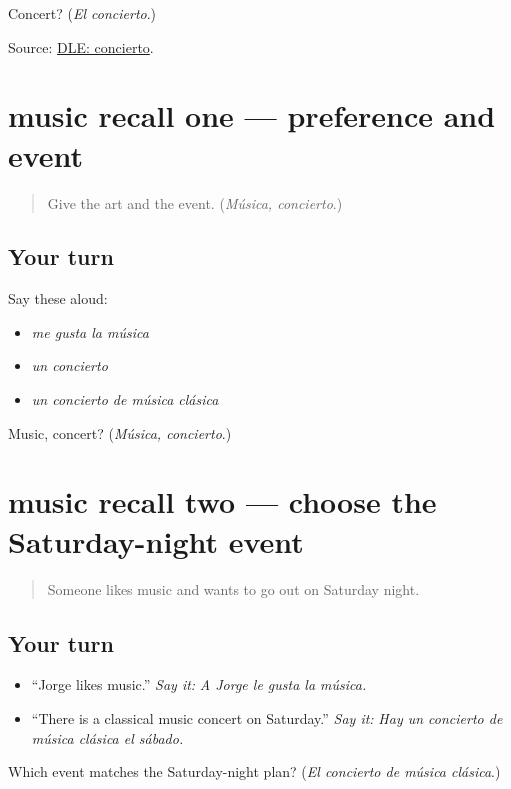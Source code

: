 \begin{tcolorbox}[breakable,colback=teal!4,colframe=teal!35!black,title={Before you move on}]
Concert? (\emph{El concierto}.)

Source: \href{https://dle.rae.es/concierto}{DLE: concierto}.
\end{tcolorbox}
\section[(review)]{music recall one — preference and event}

\label{lesson:ES-C413-music-recall-1}



\begin{quote}
Give the art and the event. (\emph{Música, concierto}.)
\end{quote}

\subsection*{Your turn}
Say these aloud:

\begin{itemize}
\raggedright
  \item \emph{me gusta la música}
  \item \emph{un concierto}
  \item \emph{un concierto de música clásica}
\end{itemize}

\begin{tcolorbox}[breakable,colback=teal!4,colframe=teal!35!black,title={Before you move on}]
Music, concert? (\emph{Música, concierto}.)
\end{tcolorbox}
\section[(review)]{music recall two — choose the Saturday-night event}

\label{lesson:ES-C413-music-recall-2}



\begin{quote}
Someone likes music and wants to go out on Saturday night.
\end{quote}

\subsection*{Your turn}
\begin{itemize}
\raggedright
  \item “Jorge likes music.” \emph{Say it:} \emph{A Jorge le gusta la música.}
  \item “There is a classical music concert on Saturday.” \emph{Say it:} \emph{Hay un concierto de música clásica el sábado.}
\end{itemize}

\begin{tcolorbox}[breakable,colback=teal!4,colframe=teal!35!black,title={Before you move on}]
Which event matches the Saturday-night plan? (\emph{El concierto de música clásica}.)
\end{tcolorbox}
